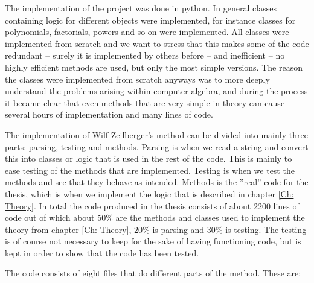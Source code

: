 The implementation of the project was done in python. In general classes containing logic for different objects were implemented, for instance classes for polynomials, factorials, powers and so on were implemented. All classes were implemented from scratch and we want to stress that this makes some of the code redundant -- surely it is implemented by others before -- and inefficient -- no highly efficient methods are used, but only the most simple versions. The reason the classes were implemented from scratch anyways was to more deeply understand the problems arising within computer algebra, and during the process it became clear that even methods that are very simple in theory can cause several hours of implementation and many lines of code.

The implementation of Wilf-Zeilberger's method can be divided into mainly three parts: parsing, testing and methods. Parsing is when we read a string and convert this into classes or logic that is used in the rest of the code. This is mainly to ease testing of the methods that are implemented. Testing is when we test the methods and see that they behave as intended. Methods is the ''real'' code for the thesis, which is when we implement the logic that is described in chapter \ref{Ch: Theory}. In total the code produced in the thesis consists of about 2200 lines of code out of which about 50\% are the methods and classes used to implement the theory from chapter \ref{Ch: Theory}, 20\% is parsing and 30\% is testing. The testing is of course not necessary to keep for the sake of having functioning code, but is kept in order to show that the code has been tested.

The code consists of eight files that do different parts of the method. These are:

